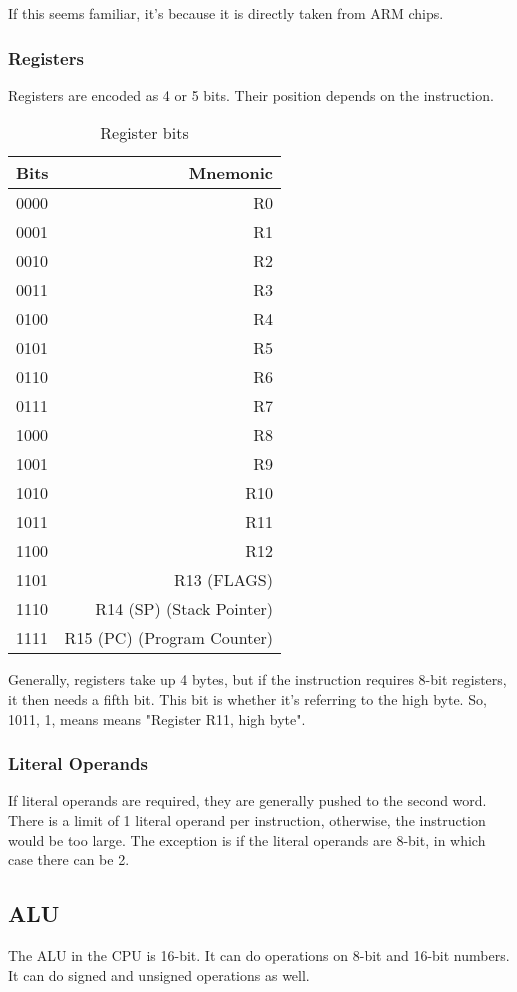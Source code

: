 \documentclass[10pt,a4paper]{article}
\begin{document}
			
			If this seems familiar, it's because it is directly taken from ARM chips.
			\subsubsection{Registers}
			Registers are encoded as 4 or 5 bits. Their position depends on the instruction.
			\begin{table}[h]
				\centering
				\begin{tabular}[h]{|l|r|}
					\hline
					Bits & Mnemonic \\
					\hline
					0000 & R0  \\ 
					0001 & R1  \\ 
					0010 & R2  \\ 
					0011 & R3  \\
					0100 & R4  \\ 
					0101 & R5  \\
					0110 & R6  \\ 
					0111 & R7  \\ 
					1000 & R8  \\ 
					1001 & R9  \\
					1010 & R10 \\ 
					1011 & R11 \\ 
					1100 & R12 \\
					1101 & R13 (FLAGS)  \\ 
					1110 & R14 (SP) (Stack Pointer)  \\
					1111 & R15 (PC) (Program Counter)  \\ 
					\hline
				\end{tabular}
				\caption{Register bits}
			\end{table}
			
			Generally, registers take up 4 bytes, but if the instruction requires 8-bit registers, it then needs a fifth bit. This bit is whether it's referring to the high byte. So, 1011, 1, means means "Register R11, high byte".
			
			\subsubsection{Literal Operands}
				If literal operands are required, they are generally pushed to the second word. There is a limit of 1 literal operand per instruction, otherwise, the instruction would be too large. The exception is if the literal operands are 8-bit, in which case there can be 2.
				
		\subsection{ALU}
			The ALU in the CPU is 16-bit. It can do operations on 8-bit and 16-bit numbers. It can do signed and unsigned operations as well.
			
\end{document}
